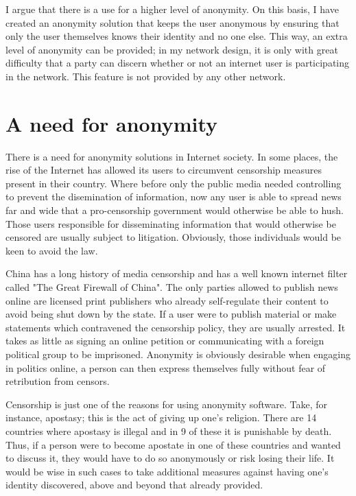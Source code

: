 \documentclass[ %
                    author={Luke Murray},
                supervisor={Dr. Simon Hollis},
                     title={Shadow Peer-to-Peer Networks},
                  subtitle={},
                    degree={MEng},
                      year={2013} ]{thesis}
\begin{document}
I argue that there is a use for a higher level of anonymity. On this basis, I have created an anonymity solution that keeps the user anonymous by ensuring that only the user themselves knows their identity and no one else. This way, an extra level of anonymity can be provided; in my network design, it is only with great difficulty that a party can discern whether or not an internet user is participating in the network. This feature is not provided by any other network.


\section{A need for anonymity}

There is a need for anonymity solutions in Internet society. In some places, the rise of the Internet has allowed its users to circumvent censorship measures present in their country. Where before only the public media needed controlling to prevent the disemination of information, now any user is able to spread news far and wide that a pro-censorship government would otherwise be able to hush. Those users responsible for disseminating information that would otherwise be censored are usually subject to litigation. Obviously, those individuals would be keen to avoid the law.

China has a long history of media censorship and has a well known internet filter called "The Great Firewall of China". The only parties allowed to publish news online are licensed print publishers who already self-regulate their content to avoid being shut down by the state. If a user were to publish material or make statements which contravened the censorship policy, they are usually arrested. It takes as little as signing an online petition or communicating with a foreign political group to be imprisoned. Anonymity is obviously desirable when engaging in politics online, a person can then express themselves fully without fear of retribution from censors.

Censorship is just one of the reasons for using anonymity software. Take, for instance, apostasy; this is the act of giving up one's religion. There are 14 countries where apostasy is illegal and in 9 of these it is punishable by death. Thus, if a person were to become apostate in one of these countries and wanted to discuss it, they would have to do so anonymously or risk losing their life. It would be wise in such cases to take additional measures against having one's identity discovered, above and beyond that already provided.
\end{document}
